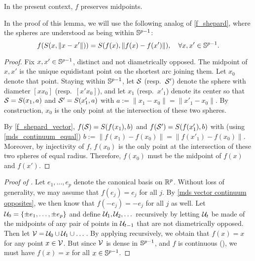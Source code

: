 \documentclass[twoside, 11pt]{article}
\begin{document}
\begin{lemma} 
\label{lem:f_shepard_vector_midpoints}
In the present context, $f$ preserves midpoints.
\end{lemma}

In the proof of this lemma, we will use the following analog of \eqref{f_shepard}, where the spheres are understood as being within $\mathbb{S}^{p-1}$:
\begin{equation}\label{f_shepard_vector}
f(S(x, \|x-x'\|)) = S(f(x), \|f(x)-f(x')\|), \quad \forall x,x' \in \mathbb{S}^{p-1}.
\end{equation}

\begin{proof}
Fix $x,x' \in \mathbb{S}^{p-1}$, distinct and not diametrically opposed. 
The midpoint of $x, x'$ is the unique equidistant point on the shortest arc joining them. Let $x_0$ denote that point. Staying within $\mathbb{S}^{p-1}$, let $\mathcal{S}$ (resp.~$\mathcal{S}'$) denote the sphere with diameter $[x x_0]$ (resp.~$[x' x_0]$), and let $x_1$ (resp.~$x'_1$) denote its center so that $\mathcal{S} = S(x_1, a)$ and $\mathcal{S}' = S(x'_1, a)$ with $a := \|x_1-x_0\| = \|x'_1-x_0\|$. By construction, $x_0$ is the only point at the intersection of these two spheres. 

By \eqref{f_shepard_vector}, $f(\mathcal{S}) = S(f(x_1), b)$ and $f(\mathcal{S}') = S(f(x'_1), b)$ with (using \eqref{mds_continuum_equal}) $b := \|f(x_1) - f(x_0)\| = \|f(x'_1) - f(x_0)\|$.
Moreover, by injectivity of $f$, $f(x_0)$ is the only point at the intersection of these two spheres of equal radius. Therefore, $f(x_0)$ must be the midpoint of $f(x)$ and $f(x')$.   
\end{proof}



\begin{proof}[Proof of ]
Let $e_1, \dots, e_p$ denote the canonical basis on $\mathbb{R}^p$. Without loss of generality, we may assume that $f(e_j) = e_j$ for all $j$. 
By \eqref{mds vector continuum opposites}, we then know that $f(-e_j) = -e_j$ for all $j$ as well.
Let $\mathcal{U}_0 = \{\pm e_1, \dots, \pm e_p\}$ and define $\mathcal{U}_1, \mathcal{U}_2, \dots$ recursively by letting $\mathcal{U}_t$ be made of the midpoints of any pair of points in $\mathcal{U}_{t-1}$ that are not diametrically opposed. 
Then let $\mathcal{V} = \mathcal{U}_0 \cup \mathcal{U}_1 \cup \dots$. 
By applying  recursively, we obtain that $f(x) = x$ for any point $x \in \mathcal{V}$. 
But since $\mathcal{V}$ is dense in $\mathbb{S}^{p-1}$, and $f$ is continuous (), we must have $f(x) = x$ for all $x \in \mathbb{S}^{p-1}$. 
\end{proof}
 
\end{document}
